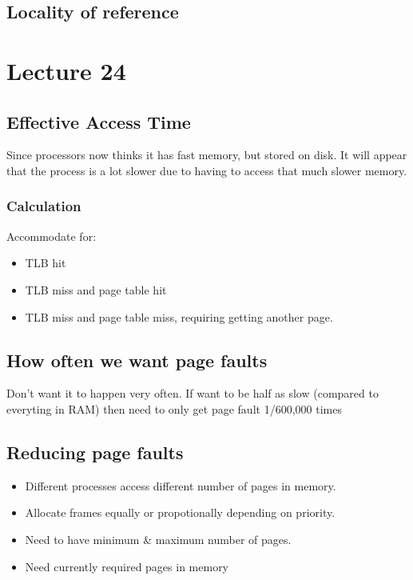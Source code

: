 \documentclass{article}
\begin{document}
	\subsection{Locality of reference}
		
		
\section{Lecture 24}
	\subsection{Effective Access Time}
		Since processors now thinks it has fast memory, but stored on disk. It will appear that the process is a lot slower due to having to access that much slower memory.
		
		\subsubsection*{Calculation}
		Accommodate for:
		\begin{itemize}
			\item TLB hit
			\item TLB miss and page table hit
			\item TLB miss and page table miss, requiring getting another page.
		\end{itemize}

	\subsection{How often we want page faults}
		Don't want it to happen very often.
		If want to be half as slow (compared to everyting in RAM) then need to only get page fault 1/600,000 times

	\subsection{Reducing page faults}
		\begin{itemize}
			\item Different processes access different number of pages in memory.
			\item Allocate frames equally or propotionally depending on priority.
			\item Need to have minimum \& maximum number of pages.
			\item Need currently required pages in memory
		\end{itemize}

		
\end{document}
